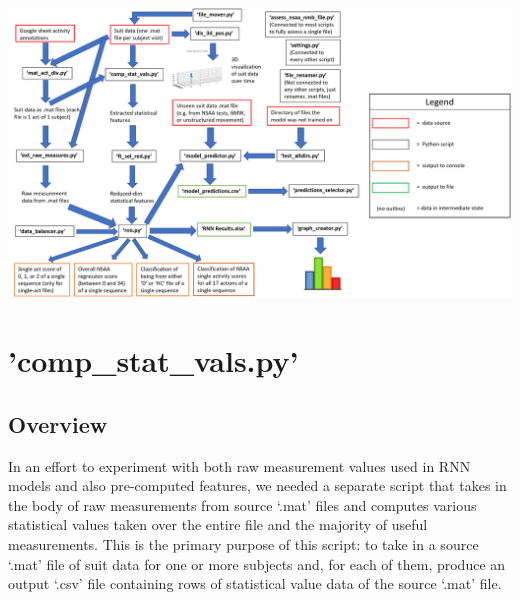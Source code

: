 \documentclass[12pt,twoside]{report}
\begin{document}
\begin{center}
\includegraphics[scale=0.8]{project_figures/fig9_1}
\end{center}

\section{'comp\_stat\_vals.py'}

\subsection{Overview}

\quad In an effort to experiment with both raw measurement values used in RNN models and also pre-computed features, we needed a separate script that takes in the body of raw measurements from source ‘.mat’ files and computes various statistical values taken over the entire file and the majority of useful measurements. This is the primary purpose of this script: to take in a source ‘.mat’ file of suit data for one or more subjects and, for each of them, produce an output ‘.csv’ file containing rows of statistical value data of the source ‘.mat’ file.\\
\end{document}
